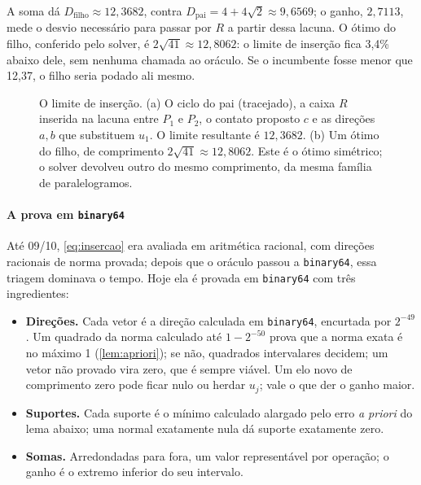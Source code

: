 \documentclass[11pt,a4paper]{article}
\theoremstyle{plain}\newtheorem{proposicao}{Proposição}
\theoremstyle{definition}\newtheorem{definicao}{Definição}
\theoremstyle{plain}\newtheorem{teorema}{Teorema}
\theoremstyle{plain}\newtheorem{lema}{Lema}
\begin{document}
A soma dá \(D_{\text{filho}}\approx12{,}3682\), contra \(D_{\text{pai}}=4+4\sqrt2\approx9{,}6569\); o ganho, \(2{,}7113\), mede o desvio necessário para passar por \(R\) a partir dessa lacuna. O ótimo do filho, conferido pelo solver, é \(2\sqrt{41}\approx12{,}8062\): o limite de inserção fica 3,4\% abaixo dele, sem nenhuma chamada ao oráculo. Se o incumbente fosse menor que 12,37, o filho seria podado ali mesmo.

\begin{figure}[ht]\centering\figinsercao
\caption{O limite de inserção. (a) O ciclo do pai (tracejado), a caixa \(R\) inserida na lacuna entre \(P_1\) e \(P_2\), o contato proposto \(c\) e as direções \(a,b\) que substituem \(u_1\). O limite resultante é \(12{,}3682\). (b) Um ótimo do filho, de comprimento \(2\sqrt{41}\approx12{,}8062\). Este é o ótimo simétrico; o solver devolveu outro do mesmo comprimento, da mesma família de paralelogramos.}\label{fig:insercao}
\end{figure}

\paragraph{A prova em \texttt{binary64}} Até 09/10, \eqref{eq:insercao} era avaliada em aritmética racional, com direções racionais de norma provada; depois que o oráculo passou a \texttt{binary64}, essa triagem dominava o tempo. Hoje ela é provada em \texttt{binary64} com três ingredientes:
\begin{itemize}[leftmargin=*,itemsep=2pt]
\item \textbf{Direções.} Cada vetor é a direção calculada em \texttt{binary64}, encurtada por \(2^{-49}\). Um quadrado da norma calculado até \(1-2^{-50}\) prova que a norma exata é no máximo 1 (\cref{lem:apriori}); se não, quadrados intervalares decidem; um vetor não provado vira zero, que é sempre viável. Um elo novo de comprimento zero pode ficar nulo ou herdar \(u_j\); vale o que der o ganho maior.
\item \textbf{Suportes.} Cada suporte é o mínimo calculado alargado pelo erro \emph{a priori} do lema abaixo; uma normal exatamente nula dá suporte exatamente zero.
\item \textbf{Somas.} Arredondadas para fora, um valor representável por operação; o ganho é o extremo inferior do seu intervalo.
\end{itemize}
\end{document}

